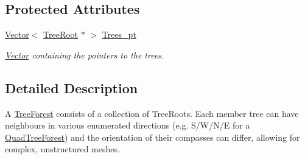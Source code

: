 \subsection*{Protected Attributes}
\begin{DoxyCompactItemize}
\item 
\hyperlink{classoomph_1_1Vector}{Vector}$<$ \hyperlink{classoomph_1_1TreeRoot}{Tree\+Root} $\ast$ $>$ \hyperlink{classoomph_1_1TreeForest_a94d44c85e121758945f04aa28aa8df2a}{Trees\+\_\+pt}
\begin{DoxyCompactList}\small\item\em \hyperlink{classoomph_1_1Vector}{Vector} containing the pointers to the trees. \end{DoxyCompactList}\end{DoxyCompactItemize}


\subsection{Detailed Description}
A \hyperlink{classoomph_1_1TreeForest}{Tree\+Forest} consists of a collection of Tree\+Roots. Each member tree can have neighbours in various enumerated directions (e.\+g. S/\+W/\+N/E for a \hyperlink{classoomph_1_1QuadTreeForest}{Quad\+Tree\+Forest}) and the orientation of their compasses can differ, allowing for complex, unstructured meshes. 

